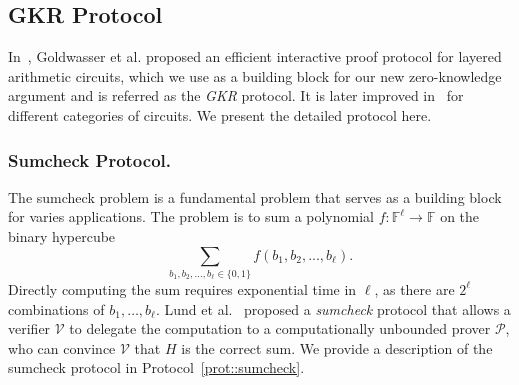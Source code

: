 
\subsection{GKR Protocol}\label{subsec::GKR}

In~\cite{GKR}, Goldwasser et al. proposed an efficient interactive proof protocol for layered arithmetic circuits, which we use as a building block for our new zero-knowledge argument and is referred as the \emph{GKR} protocol. It is later improved in~\cite{CMT,t13, wahby2017full,vram} for different categories of circuits. We present the detailed protocol here.



\subsubsection{Sumcheck Protocol.}
\label{subsec::sumcheck}
The sumcheck problem is a fundamental problem that serves as a building block for varies applications. The problem is to sum a polynomial $f: \mathbb{F}^\ell \rightarrow \mathbb{F}$ on the binary hypercube $$\sum\limits_{b_1,b_2,\ldots,b_\ell\in\{0,1\}}f(b_1,b_2,...,b_\ell).$$ 
Directly computing the sum requires exponential time in $\ell$, as there are $2^\ell$ combinations of $b_1,\ldots,b_\ell$. Lund et al.~\cite{sumcheck} proposed a \emph{sumcheck} protocol that allows a verifier $\mathcal{V}$ to delegate the computation to a computationally unbounded prover $\mathcal{P}$, who can convince $\mathcal{V}$ that $H$ is the correct sum. We provide a description of the sumcheck protocol in Protocol~\ref{prot::sumcheck}.

